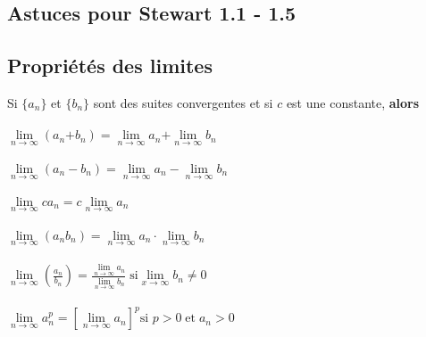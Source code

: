 \documentclass{report}
\begin{document}
\begin{multicols*}{3}
                                                



     





    

       








        





  





 
    \chapter{Astuces pour Stewart 1.1 - 1.5}
    \section{Propriétés des limites}
        Si $\{a_n\}$ et $\{b_n\}$ sont des suites convergentes et 
        si $c$ est une constante, \textbf{alors} \\\\ 
        $\lim\limits_{n\to\infty  }\left(a_n \text{+} b_n \right) = 
        \lim\limits_{n\to\infty  }a_n \text{+} 
        \lim\limits_{n\to\infty  }b_n$
        \\\\
        $\lim\limits_{n\to\infty  }\left(a_n - b_n \right) = 
        \lim\limits_{n\to\infty  }a_n - \lim\limits_{n\to\infty  }b_n$ 
        \\\\
        $\lim\limits_{n\to\infty  }ca_n = c \lim\limits_{n \to \infty  }a_n$ 
        \\\\
        $\lim\limits_{n\to\infty  }\left(a_nb_n \right) = 
        \lim\limits_{n\to\infty  }a_n \cdot \lim\limits_{n\to\infty  }b_n$
        \\\\
        $\lim\limits_{n\to\infty  }\left(\frac{a_n}{b_n} \right) = 
        \frac{\lim\limits_{n\to\infty  }a_n}{\lim\limits_{n\to\infty  }b_n}
        \;
        \text{si} \lim\limits_{x\to\infty  }b_n \neq 0$
        \\\\
        $\lim\limits_{n\to\infty  }a_n^{p} = 
        \left[\lim\limits_{n\to\infty  }a_n \right]^p \text{si } 
        p > 0 \; \text{et} \; a_n > 0$




\end{multicols*}
\end{document}

